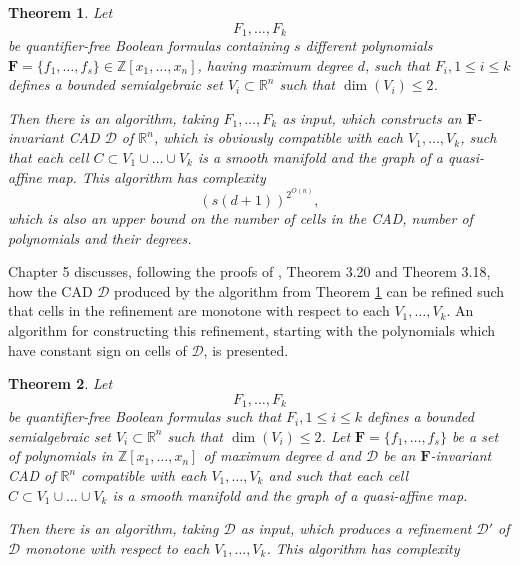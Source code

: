 \documentclass[
]{book}
\newtheorem{theorem}{Theorem}[chapter]
\theoremstyle{definition}
\theoremstyle{definition}
\theoremstyle{definition}
\theoremstyle{definition}
\theoremstyle{remark}
\begin{document}
\begin{theorem}
\protect\hypertarget{thm:bgv-quasi-algorithm}{}\label{thm:bgv-quasi-algorithm}Let
\[
F_1,\ldots,F_k
\]
be quantifier-free Boolean formulas containing \(s\) different polynomials \(\mathbf{F} = \{ f_1,\ldots, f_s \} \in \mathbb{Z}[x_1,\ldots,x_n]\), having maximum degree \(d\), such that \(F_i, 1\le i \le k\) defines a bounded semialgebraic set \(V_i \subset \mathbb{R}^n\) such that \(\dim(V_i) \le 2\).

Then there is an algorithm, taking \(F_1,\ldots,F_k\) as input, which constructs an \(\mathbf{F}\)-invariant CAD \(\mathcal{D}\) of \(\mathbb{R}^n\), which is obviously compatible with each \(V_1,\ldots,V_k\), such that each cell \(C \subset V_1\cup \ldots\cup V_k\) is a smooth manifold and the graph of a quasi-affine map.
This algorithm has complexity
\[
\left(s\left(d+1\right)\right)^{2^{O(n)}},
\]
which is also an upper bound on the number of cells in the CAD, number of polynomials and their degrees.
\end{theorem}

Chapter 5 discusses, following the proofs of \citet{bgv15}, Theorem 3.20 and Theorem 3.18, how the CAD \(\mathcal{D}\) produced by the algorithm from Theorem \ref{thm:bgv-quasi-algorithm} can be refined such that cells in the refinement are monotone with respect to each \(V_1,\ldots,V_k\). An algorithm for constructing this refinement, starting with the polynomials which have constant sign on cells of \(\mathcal{D}\), is presented.

\begin{theorem}
\protect\hypertarget{thm:bgv-monotone-algorithm}{}\label{thm:bgv-monotone-algorithm}Let
\[
F_1,\ldots,F_k
\]
be quantifier-free Boolean formulas such that \(F_i, 1\le i \le k\) defines a bounded semialgebraic set \(V_i \subset \mathbb{R}^n\) such that \(\dim(V_i) \le 2\).
Let \(\mathbf{F} = \{f_1,\ldots,f_s\}\) be a set of polynomials in \(\mathbb{Z}[x_1,\ldots,x_n]\) of maximum degree \(d\) and \(\mathcal{D}\) be an \(\mathbf{F}\)-invariant CAD of \(\mathbb{R}^n\) compatible with each \(V_1,\ldots,V_k\) and such that each cell \(C \subset V_1\cup\ldots\cup V_k\) is a smooth manifold and the graph of a quasi-affine map.

Then there is an algorithm, taking \(\mathcal{D}\) as input, which produces a refinement \(\mathcal{D'}\) of \(\mathcal{D}\) monotone with respect to each \(V_1, \ldots, V_k\).
This algorithm has complexity
\end{theorem}
\end{document}
